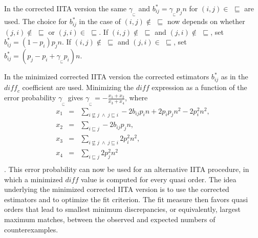 \documentclass[nojss]{jss}
\begin{document}
In the corrected IITA version 
the same $\gamma_{_\sqsubseteq}$ and $b^*_{ij} = \gamma_{_\sqsubseteq} p_j n$ for 
$(i,j) \in \,\,\sqsubseteq$ are used.
The choice for $b^*_{ij}$ in the case of $(i,j) \not \in \,\,\sqsubseteq$ now depends 
on whether $(j,i) \not \in \,\,\sqsubseteq$ or $(j,i) \in \,\,\sqsubseteq$.
If $(i,j) \not \in \,\,\sqsubseteq$ and $(j,i) \not \in \,\,\sqsubseteq$, set $b^*_{ij} = (1-p_i)p_j n$. 
If $(i,j) \not \in \,\,\sqsubseteq$ and $(j,i) \in \,\,\sqsubseteq$, 
set $b^*_{ij} = (p_j - p_i + \gamma_{_\sqsubseteq}p_i) n$.

In the minimized corrected IITA version the corrected estimators $b^*_{ij}$ as in the $\mathit{diff_c}$ coefficient are used. 
Minimizing the $\mathit{diff}$ expression as a function of the error probability $\gamma_{_\sqsubseteq}$
gives $\gamma_{_\sqsubseteq} = -\frac{x_1 + x_2}{ x_3 + x_4}$, where
\begin{eqnarray*}
x_1 &=& \sum_{i \not \sqsubseteq j \; \wedge \; j \sqsubseteq i} -2b_{ij}p_i n + 2p_ip_j n^2 - 2p^2_i n^2, \\
x_2 &=& \sum_{i \sqsubseteq j} -2b_{ij}p_j n, \\
x_3 &=& \sum_{i \not \sqsubseteq j  \; \wedge \; j \sqsubseteq i} 2p^2_i n^2, \\
x_4 &=& \sum_{i \sqsubseteq j} 2 p^2_j n^2\\
\end{eqnarray*}
\citep[for details, see][]{SU:09}. This error probability can now be used for an alternative IITA procedure, in which a minimized $\mathit{diff}$ value is computed for every quasi order.
The idea underlying the minimized corrected IITA version is to use the corrected estimators 
and to optimize the fit criterion. The fit measure then favors quasi orders that lead to smallest minimum discrepancies, or equivalently, largest maximum matches, between the observed and expected numbers of counterexamples. 
\end{document}
